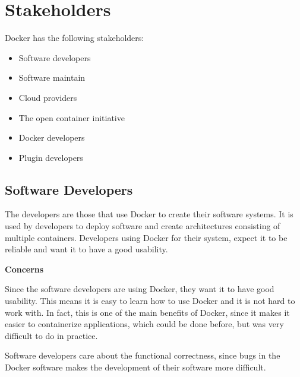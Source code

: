 
\section{Stakeholders}
\label{sec:stakeholders}

Docker has the following stakeholders:
\begin{itemize}
\item Software developers
\item Software maintain
\item Cloud providers
\item The open container initiative
\item Docker developers
\item Plugin developers
\end{itemize}

\subsection*{Software Developers}
The developers are those that use Docker to create their software systems. It is used by developers to deploy software and create architectures consisting of multiple containers. Developers using Docker for their system, expect it to be reliable and want it to have a good usability. 

\textbf{Concerns}
\begin{description}[labelindent=25pt,style=multiline,leftmargin=4.0cm,font=\normalfont\itshape]

\item[Usability] Since the software developers are using Docker, they want it to have good usability. This means it is easy to learn how to use Docker and it is not hard to work with. In fact, this is one of the main benefits of Docker, since it makes it easier to containerize applications, which could be done before, but was very difficult to do in practice.


\item[Functional correctness] Software developers care about the functional correctness, since bugs in the Docker software makes the development of their software more difficult. 

\end{description}

